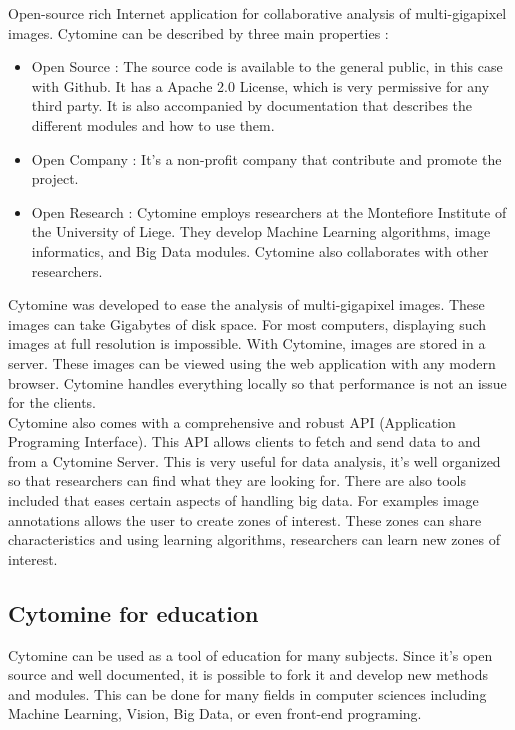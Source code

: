 \documentclass[a4paper,11pt]{report}
\numberwithin{figure}{section} %
\begin{document}
Open-source rich Internet application for collaborative analysis of multi-gigapixel images.
Cytomine can be described by three main properties :
\begin{itemize}
\item[\textbullet] Open Source : The source code is available to the general public, in this case with Github.
It has a Apache 2.0 License, which is very permissive for any third party.
It is also accompanied by documentation that describes the different modules and how to use them.
\item[\textbullet] Open Company : It's a non-profit company that contribute and promote the project.
\item[\textbullet] Open Research : Cytomine employs researchers at the Montefiore Institute of the University of Liege.
They develop Machine Learning algorithms, image informatics, and Big Data modules.
Cytomine also collaborates with other researchers.
\end{itemize}

Cytomine was developed to ease the analysis of multi-gigapixel images.
These images can take Gigabytes of disk space.
For most computers, displaying such images at full resolution is impossible.
With Cytomine, images are stored in a server.
These images can be viewed using the web application with any modern browser.
Cytomine handles everything locally so that performance is not an issue for the clients.\\

	Cytomine also comes with a comprehensive and robust API (Application Programing Interface).
	This API allows clients to fetch and send data to and from a Cytomine Server.
	This is very useful for data analysis, it's well organized so that researchers can find what they are looking for.
	There are also tools included that eases certain aspects of handling big data.
	For examples image annotations allows the user to create zones of interest.
	These zones can share characteristics and using learning algorithms, researchers can learn new zones of interest.

\subsection{Cytomine for education}

Cytomine can be used as a tool of education for many subjects.
Since it's open source and well documented, it is possible to fork it and develop new methods and modules.
This can be done for many fields in computer sciences including Machine Learning, Vision, Big Data, or even front-end programing.\\
\end{document}

